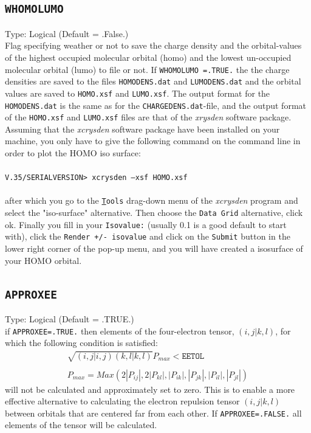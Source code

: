 \documentclass[a4paper,twoside,openany]{book}
\begin{document}
{{\subsection{\texttt{WHOMOLUMO}}
Type: Logical (Default = .False.)\\
Flag specifying weather or not to save the charge density and the orbital-values of the highest occupied molecular orbital (homo) and the lowest un-occupied molecular orbital (lumo) to  file or not. If \texttt{WHOMOLUMO =.TRUE.} the the charge densities  are saved to the files \texttt{HOMODENS.dat} and \texttt{LUMODENS.dat} and the orbital values are saved to \texttt{HOMO.xsf} and \texttt{LUMO.xsf}. The output format for the \texttt{HOMODENS.dat} is the same as for the  \texttt{CHARGEDENS.dat}-file, 
and the output format of the \texttt{HOMO.xsf} and \texttt{LUMO.xsf} files are that of the {\it xrysden} software package. Assuming that the {\it xcrysden} software package have been installed on your machine, you only have to give the following command 
on the command line in order to plot the HOMO iso surface: \\ \\
 \texttt{V.35/SERIALVERSION> xcrysden --xsf HOMO.xsf }
 \\ \\
 after which  you go to the  \texttt{\underline{T}ools} drag-down menu of the {\it xcrysden} program and select the  "iso-surface" alternative. Then choose the \texttt{Data Grid} alternative, click ok. Finally you fill in 
 your \texttt{Isovalue:} (usually 0.1 is a good default to start with), click the  \texttt{Render +/- isovalue} and click on the  \texttt{Submit} button in the lower right corner of the pop-up menu, and you will have created 
 a isosurface of your HOMO orbital.
 

\subsection{\texttt{APPROXEE}}
Type: Logical (Default = .TRUE.)\\
if \texttt{APPROXEE=.TRUE.} then elements of the four-electron tensor, $(i,j|k,l)$, for which the following condition is satisfied:
\begin{eqnarray}
\sqrt{(i,j|i,j)(k,l|k,l)}P_{max} < \texttt{EETOL} \\
\nonumber \\
P_{max}=Max(2|P_{ij}|, 2|P_{kl}|, |P_{ik}|,|P_{jk}|,|P_{il}|,|P_{jl}|)
\end{eqnarray}
will not be calculated and approximately set to zero. This is to enable a more effective alternative to calculating the electron repulsion tensor $(i,j|k,l)$ between orbitals  that are centered far from 
each other. If \texttt{APPROXEE=.FALSE.} all elements of the tensor will be calculated.

}}
\end{document}
